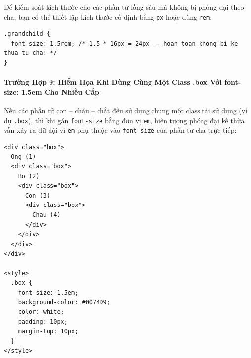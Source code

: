 \documentclass[11pt,oneside]{book}
\newcommand{\thd}[1]{\textcolor{white}{\textbf{\strut #1}}}
\newcommand{\codeinline}[1]{\textcolor{accentOrange}{\texttt{#1}}}
\begin{document}
\begin{prettyTableBox}
\sffamily\small
{}
\end{prettyTableBox}

\begin{tipBox}
Để kiểm soát kích thước cho các phần tử lồng sâu mà không bị phóng đại theo cha, bạn có thể thiết lập kích thước cố định bằng \codeinline{px} hoặc dùng \codeinline{rem}:
\begin{lstlisting}[language=CSS3]
.grandchild {
  font-size: 1.5rem; /* 1.5 * 16px = 24px -- hoan toan khong bi ke thua tu cha! */
}
\end{lstlisting}
\end{tipBox}

\paragraph{Trường Hợp 9: Hiểm Họa Khi Dùng Cùng Một Class .box Với font-size: 1.5em Cho Nhiều Cấp:}
Nếu các phần tử con -- cháu -- chắt đều sử dụng chung một class tái sử dụng (ví dụ \codeinline{.box}), thì khi gán \codeinline{font-size} bằng đơn vị \codeinline{em}, hiện tượng phóng đại kế thừa vẫn xảy ra dữ dội vì \codeinline{em} phụ thuộc vào \codeinline{font-size} của phần tử cha trực tiếp:

\begin{codeWindow}
\begin{lstlisting}[language=HTML5]
<div class="box">
  Ong (1)
  <div class="box">
    Bo (2)
    <div class="box">
      Con (3)
      <div class="box">
        Chau (4)
      </div>
    </div>
  </div>
</div>

<style>
  .box {
    font-size: 1.5em;
    background-color: #0074D9;
    color: white;
    padding: 10px;
    margin-top: 10px;
  }
</style>
\end{lstlisting}
\end{codeWindow}
\end{document}
